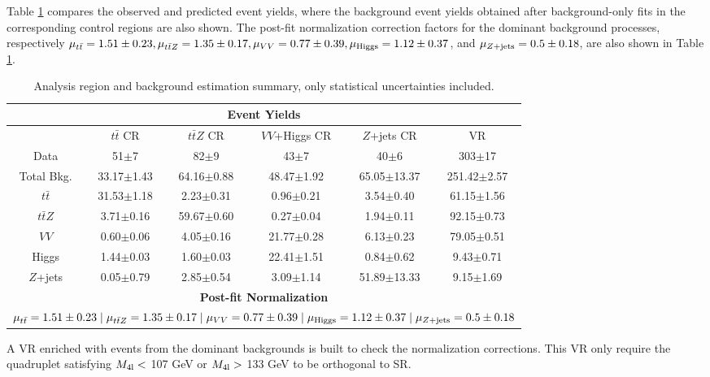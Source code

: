 Table \ref{Tab.yields} compares the observed and predicted event yields, where the background event yields obtained after background-only fits in the corresponding control regions are also shown. The post-fit normalization correction factors for the dominant background processes, respectively $\mu_{t\bar{t}}=1.51\pm0.23,\mu_{t\bar{t}Z}=1.35\pm0.17,\mu_{VV}=0.77\pm0.39,\mu_{\rm Higgs}=1.12\pm0.37$, and $\mu_{Z+{\rm jets}}=0.5\pm0.18$, are also shown in Table \ref{Tab.yields}.

\begin{table}[H]
\begin{center}
\caption{Analysis region and background estimation summary, only statistical uncertainties included.}
\label{Tab.yields}
	\begin{tabular}{cccccc}
		\toprule
		\toprule
		\multicolumn{6}{c}{\textbf{Event Yields}}\\
		\midrule
		&$t\bar{t}$ CR&$t\bar{t}Z$ CR&$VV$+Higgs CR&$Z$+jets CR&VR\\
		\midrule
		Data	&51$\pm$7&82$\pm$9&43$\pm$7&40$\pm$6&303$\pm$17\\
		\midrule
		Total Bkg.&33.17$\pm$1.43&64.16$\pm$0.88&48.47$\pm$1.92&65.05$\pm$13.37&251.42$\pm$2.57\\
		\midrule
		$t\bar{t}$&31.53$\pm$1.18&2.23$\pm$0.31&0.96$\pm$0.21&3.54$\pm$0.40&61.15$\pm$1.56\\
		$t\bar{t}Z$&3.71$\pm$0.16&59.67$\pm$0.60&0.27$\pm$0.04&1.94$\pm$0.11&92.15$\pm$0.73\\
		$VV$	&0.60$\pm$0.06&4.05$\pm$0.16&21.77$\pm$0.28&6.13$\pm$0.23&79.05$\pm$0.51\\
		Higgs	&1.44$\pm$0.03&1.60$\pm$0.03&22.41$\pm$1.51&0.84$\pm$0.62&9.43$\pm$0.71\\
		$Z$+jets&0.05$\pm$0.79&2.85$\pm$0.54&3.09$\pm$1.14&51.89$\pm$13.33&9.15$\pm$1.69\\
		\midrule
		\midrule
		\multicolumn{6}{c}{\textbf{Post-fit Normalization}}\\
		\midrule
		\multicolumn{6}{c}{$\mu_{t\bar{t}}=1.51\pm0.23\mid\mu_{t\bar{t}Z}=1.35\pm0.17\mid\mu_{VV}=0.77\pm0.39\mid\mu_{\rm Higgs}=1.12\pm0.37\mid\mu_{Z+{\rm jets}}=0.5\pm0.18$}\\
		\bottomrule
		\bottomrule
	\end{tabular}
\end{center}
\end{table}

A VR enriched with events from the dominant backgrounds is built to check the normalization corrections. This VR only require the quadruplet satisfying $M_{\rm 4l}<$ 107 GeV or $M_{\rm 4l}>$ 133 GeV to be orthogonal to SR.

